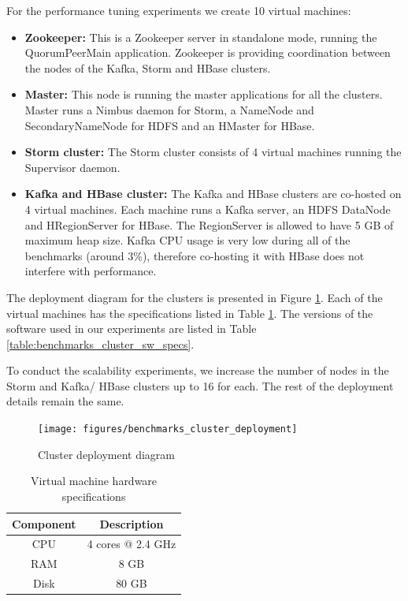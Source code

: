 For the performance tuning experiments we create 10 virtual machines:
\begin{itemize}
\item \textbf{Zookeeper:} This is a Zookeeper server in standalone mode, running the QuorumPeerMain application. Zookeeper is providing coordination between the nodes of the Kafka, Storm and HBase clusters.
\item \textbf{Master:} This node is running the master applications for all the clusters. Master runs a Nimbus daemon for Storm, a NameNode and SecondaryNameNode for HDFS and an HMaster for HBase.
\item \textbf{Storm cluster:} The Storm cluster consists of 4 virtual machines running the Supervisor daemon.
\item \textbf{Kafka and HBase cluster:} The Kafka and HBase clusters are co-hosted on 4 virtual machines. Each machine runs a Kafka server, an HDFS DataNode and HRegionServer for HBase. The RegionServer is allowed to have 5 GB of maximum heap size. Kafka CPU usage is very low during all of the benchmarks (around 3\%), therefore co-hosting it with HBase does not interfere with performance.
\end{itemize}

The deployment diagram for the clusters is presented in Figure \ref{figure:benchmarks_cluster_deployment}. Each of the virtual machines has the specifications listed in Table \ref{table:benchmarks_cluster_hw_specs}. The versions of the software used in our experiments are listed in Table \ref{table:benchmarks_cluster_sw_specs}.

To conduct the scalability experiments, we increase the number of nodes in the Storm and Kafka/ HBase clusters up to 16 for each. The rest of the deployment details remain the same.

\begin{figure}[h!]
\centering
\texttt{[image: figures/benchmarks\_cluster\_deployment]}
\caption{Cluster deployment diagram}
\label{figure:benchmarks_cluster_deployment}
\end{figure}

\begin{table}[h!]
\centering
\begin{tabular}{ |c|c| }
\hline
Component & Description \\ \hline \hline
CPU & 4 cores @ 2.4 GHz \\ \hline
RAM & 8 GB \\ \hline
Disk & 80 GB \\ \hline
\end{tabular}
\caption{Virtual machine hardware specifications}
\label{table:benchmarks_cluster_hw_specs}
\end{table}

